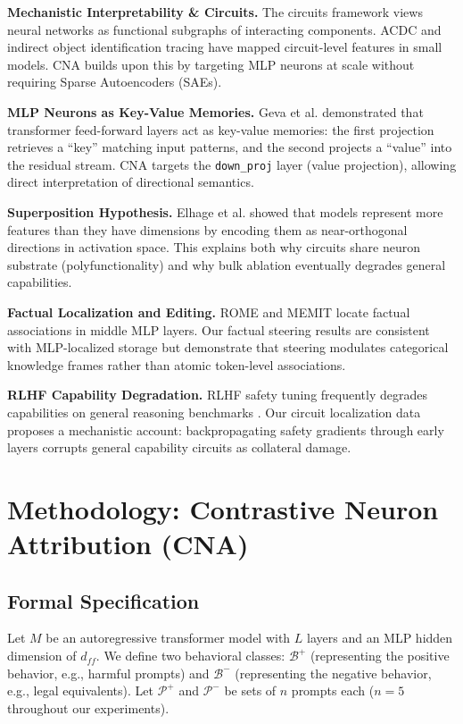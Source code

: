 \documentclass[11pt]{article}
\begin{document}
\textbf{Mechanistic Interpretability \& Circuits.} The circuits framework \cite{olah2020zoom} views neural networks as functional subgraphs of interacting components. ACDC \cite{conmy2023towards} and indirect object identification tracing \cite{wang2022interpretability} have mapped circuit-level features in small models. CNA builds upon this by targeting MLP neurons at scale without requiring Sparse Autoencoders (SAEs).

\textbf{MLP Neurons as Key-Value Memories.} Geva et al. \cite{geva2021transformer} demonstrated that transformer feed-forward layers act as key-value memories: the first projection retrieves a ``key'' matching input patterns, and the second projects a ``value'' into the residual stream. CNA targets the \texttt{down\_proj} layer (value projection), allowing direct interpretation of directional semantics.

\textbf{Superposition Hypothesis.} Elhage et al. \cite{elhage2022toy} showed that models represent more features than they have dimensions by encoding them as near-orthogonal directions in activation space. This explains both why circuits share neuron substrate (polyfunctionality) and why bulk ablation eventually degrades general capabilities.

\textbf{Factual Localization and Editing.} ROME \cite{meng2022locating} and MEMIT \cite{meng2023mass} locate factual associations in middle MLP layers. Our factual steering results are consistent with MLP-localized storage but demonstrate that steering modulates categorical knowledge frames rather than atomic token-level associations.

\textbf{RLHF Capability Degradation.} RLHF safety tuning frequently degrades capabilities on general reasoning benchmarks \cite{ouyang2022training}. Our circuit localization data proposes a mechanistic account: backpropagating safety gradients through early layers corrupts general capability circuits as collateral damage.

\section{Methodology: Contrastive Neuron Attribution (CNA)}

\subsection{Formal Specification}

Let $M$ be an autoregressive transformer model with $L$ layers and an MLP hidden dimension of $d_{ff}$. We define two behavioral classes: $\mathcal{B}^+$ (representing the positive behavior, e.g., harmful prompts) and $\mathcal{B}^-$ (representing the negative behavior, e.g., legal equivalents). Let $\mathcal{P}^+$ and $\mathcal{P}^-$ be sets of $n$ prompts each ($n=5$ throughout our experiments). 
\end{document}
